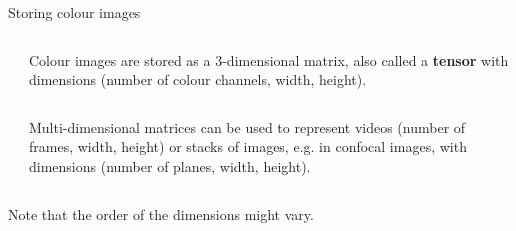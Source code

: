 \documentclass[9pt, aspectratio=169]{beamer}
\begin{document}
\begin{frame}
    {Storing colour images}
    \begin{columns}
        \begin{column}{.3\textwidth}
        \end{column}
        \begin{column}{0.7\textwidth}
            Colour images are stored as a 3-dimensional matrix, also called a \textbf{tensor} with dimensions (number of colour channels, width, height).
        \end{column}
    \end{columns}
    \vspace{2em}
    \pause
    \begin{columns}
        \begin{column}{0.3\textwidth}
        \end{column}
        \begin{column}{0.7\textwidth}
            Multi-dimensional matrices can be used to represent videos (number of frames, width, height) or stacks of images, e.g. in confocal images, with dimensions (number of planes, width, height).
        \end{column}
    \end{columns}

    \vspace{1em}
    Note that the order of the dimensions might vary.
\end{frame}
\end{document}

